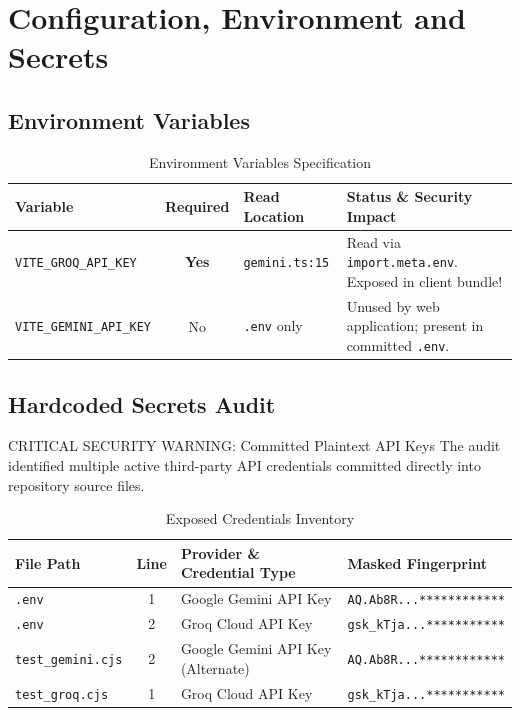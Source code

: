 \documentclass[10pt,a4paper]{report}
\begin{document}
\chapter{Configuration, Environment and Secrets}

\section{Environment Variables}

\begin{table}[htbp]
\centering
\small
\caption{Environment Variables Specification}
\begin{tabularx}{\textwidth}{l c l X}
\toprule
\textbf{Variable} & \textbf{Required} & \textbf{Read Location} & \textbf{Status \& Security Impact} \\
\midrule
\texttt{VITE\_GROQ\_API\_KEY} & \textbf{Yes} & \texttt{gemini.ts:15} & Read via \texttt{import.meta.env}. Exposed in client bundle! \\
\texttt{VITE\_GEMINI\_API\_KEY} & No & \texttt{.env} only & Unused by web application; present in committed \texttt{.env}. \\
\bottomrule
\end{tabularx}
\end{table}

\section{Hardcoded Secrets Audit}

\begin{critBox}{CRITICAL SECURITY WARNING: Committed Plaintext API Keys}
The audit identified multiple active third-party API credentials committed directly into repository source files.
\end{critBox}

\begin{table}[htbp]
\centering
\small
\caption{Exposed Credentials Inventory}
\begin{tabularx}{\textwidth}{l c l l}
\toprule
\textbf{File Path} & \textbf{Line} & \textbf{Provider \& Credential Type} & \textbf{Masked Fingerprint} \\
\midrule
\texttt{.env} & 1 & Google Gemini API Key & \texttt{AQ.Ab8R...************} \\
\texttt{.env} & 2 & Groq Cloud API Key & \texttt{gsk\_kTja...***********} \\
\texttt{test\_gemini.cjs} & 2 & Google Gemini API Key (Alternate) & \texttt{AQ.Ab8R...************} \\
\texttt{test\_groq.cjs} & 1 & Groq Cloud API Key & \texttt{gsk\_kTja...***********} \\
\bottomrule
\end{tabularx}
\end{table}
\end{document}

